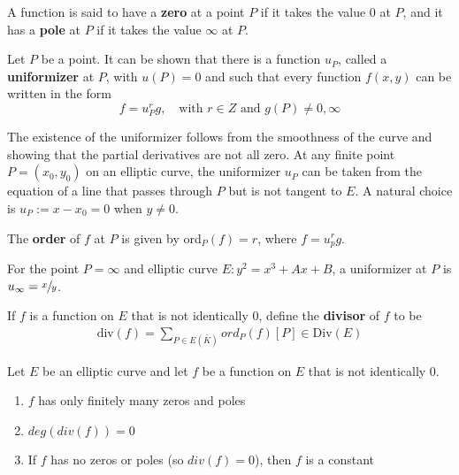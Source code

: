 
\begin{definition}
A function is said to have a \textbf{zero} at a point $P$ if it takes the value $0$ at $P$, and it has a \textbf{pole} at $P$ if it takes the value $\infty$ at $P$. 
\end{definition}

Let $P$ be a point. It can be shown that there is a function $u_P$, called a \textbf{uniformizer} at $P$, with $u(P) = 0$ and such that every function $f(x, y)$ can be written in the form 
\begin{equation*}
	f = u_P^r g, \quad \text{with } r \in Z \,\, \text{and } g(P) \neq 0, \infty
\end{equation*}

The existence of the uniformizer follows from the smoothness of the curve and showing that the partial derivatives are not all zero. At any finite point $P = (x_0, y_0)$ on an elliptic curve, the uniformizer $u_P$ can be taken from the equation of a line that passes through $P$ but is not tangent to $E$. A natural choice is $u_P := x - x_0 = 0$ when $y \neq 0$.

\begin{definition}
The \textbf{order} of $f$ at $P$ is given by ord$_P(f) = r$, where $f = u_p^r g$. 
\end{definition}

For the point $P = \infty$ and elliptic curve $E : y^2 = x^3 + Ax + B$, a uniformizer at $P$ is $u_{\infty} = \sfrac{x}{y}$.     

\begin{definition}
If $f$ is a function on $E$ that is not identically $0$, define the \textbf{divisor} of $f$ to be 
\begin{align}
	\text{div}(f) = \sum_{P \in E(\bar{K})}ord_P (f) [P] \in \text{Div}(E)
\end{align}
\end{definition}

\begin{theorem}
\label{zeros:poles}
Let $E$ be an elliptic curve and let $f$ be a function on $E$ that is not identically $0$. 
\begin{enumerate} 
	\item $f$ has only finitely many zeros and poles 
	\item $deg(div(f)) = 0$
	\item If $f$ has no zeros or poles (so $div(f) = 0$), then $f$ is a constant
\end{enumerate}
\end{theorem}

